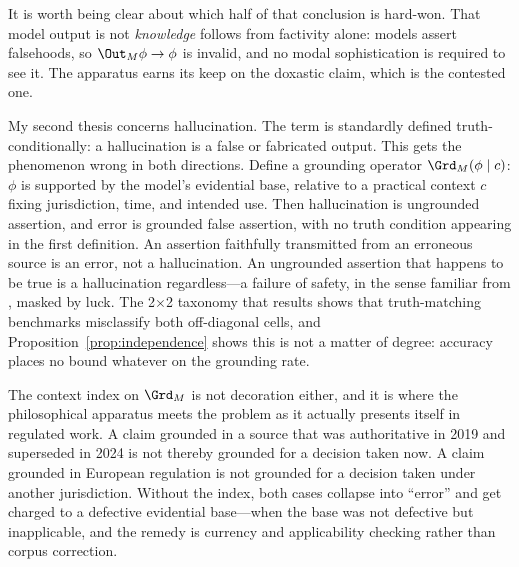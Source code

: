 It is worth being clear about which half of that conclusion is hard-won. That
model output is not \emph{knowledge} follows from factivity alone: models assert
falsehoods, so $\Out_M \phi \rightarrow \phi$ is invalid, and no modal
sophistication is required to see it. The apparatus earns its keep on the
doxastic claim, which is the contested one.

My second thesis concerns hallucination. The term is standardly defined
truth-conditionally: a hallucination is a false or fabricated output. This gets
the phenomenon wrong in both directions. Define a grounding operator
$\Grd_M(\phi \mid c)$: $\phi$ is supported by the model's evidential base,
relative to a practical context $c$ fixing jurisdiction, time, and intended use.
Then hallucination is ungrounded assertion, and error is grounded false
assertion, with no truth condition appearing in the first definition. An
assertion faithfully transmitted from an erroneous source is an error, not a
hallucination. An ungrounded assertion that happens to be true is a
hallucination regardless---a failure of safety, in the sense familiar from
\citet{sosa1999}, masked by luck. The 2$\times$2 taxonomy that results shows
that truth-matching benchmarks misclassify both off-diagonal cells, and
Proposition~\ref{prop:independence} shows this is not a matter of degree:
accuracy places no bound whatever on the grounding rate.

The context index on $\Grd_M$ is not decoration either, and it is where the
philosophical apparatus meets the problem as it actually presents itself in
regulated work. A claim grounded in a source that was authoritative in 2019 and
superseded in 2024 is not thereby grounded for a decision taken now. A claim
grounded in European regulation is not grounded for a decision taken under
another jurisdiction. Without the index, both cases collapse into ``error'' and
get charged to a defective evidential base---when the base was not defective but
inapplicable, and the remedy is currency and applicability checking rather than
corpus correction.

